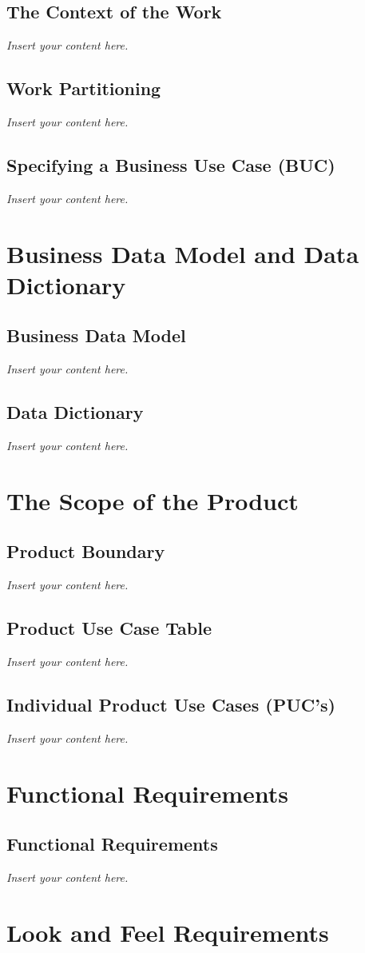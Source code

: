 \documentclass[12pt]{article}
\newcommand{\lips}{\textit{Insert your content here.}}
\begin{document}
\subsection{The Context of the Work}
\lips
\subsection{Work Partitioning}
\lips
\subsection{Specifying a Business Use Case (BUC)}
\lips

\section{Business Data Model and Data Dictionary}
\subsection{Business Data Model}
\lips
\subsection{Data Dictionary}
\lips

\section{The Scope of the Product}
\subsection{Product Boundary}
\lips
\subsection{Product Use Case Table}
\lips
\subsection{Individual Product Use Cases (PUC's)}
\lips

\section{Functional Requirements}
\subsection{Functional Requirements}
\lips

\section{Look and Feel Requirements}
\end{document}
